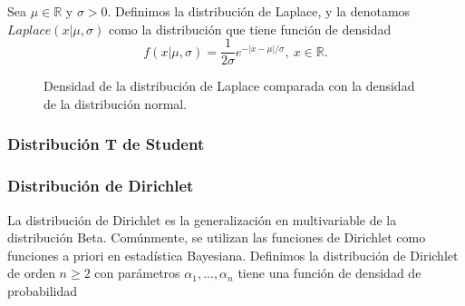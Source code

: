 \documentclass{article}
\begin{document}
\begin{definition}
    Sea $\mu \in \mathbb{R}$ y $\sigma > 0$. Definimos la distribución de Laplace, y la denotamos $Laplace(x | \mu, \sigma)$ como la distribución que tiene función de densidad
    \[f(x | \mu, \sigma) = \frac{1}{2 \sigma} e^{-|x - \mu| / \sigma}, \ x \in \mathbb{R}.\]
\end{definition}

\begin{figure}[H]
    \caption{Densidad de la distribución de Laplace comparada con la densidad de la distribución normal.}
    \label{fig:laplace}
\end{figure}


\subsubsection{Distribución T de Student}

\subsubsection{Distribución de Dirichlet}
		La distribución de Dirichlet es la generalización en multivariable de la distribución Beta. Comúnmente, se utilizan las funciones de Dirichlet como funciones a priori en estadística Bayesiana. Definimos la distribución de Dirichlet de orden $n \geq 2$ con parámetros $\alpha_1, ..., \alpha_n$ tiene una función de densidad de probabilidad
\end{document}
